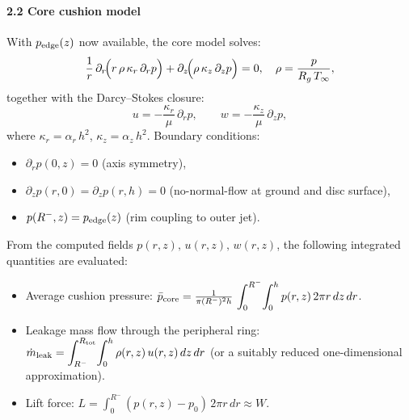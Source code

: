 \documentclass[11pt,a4paper]{article}
\begin{document}
\paragraph{2.2 Core cushion model}  
With \(p_{\rm edge}(z)\) now available, the core model solves:
\[
  \frac{1}{r}\,\partial_r\!\Bigl(r\,\rho\,\kappa_r\,\partial_r p\Bigr)
  + \partial_z\!\Bigl(\rho\,\kappa_z\,\partial_z p\Bigr) = 0,
  \quad
  \rho = \frac{p}{R_g\,T_\infty}, 
\]
together with the Darcy–Stokes closure:
\[
  u = -\frac{\kappa_r}{\mu}\,\partial_r p,
  \qquad
  w = -\frac{\kappa_z}{\mu}\,\partial_z p,
\]
where \(\kappa_r=\alpha_r\,h^2\), \(\kappa_z=\alpha_z\,h^2\).  
Boundary conditions:
\begin{itemize}
  \item \(\partial_r p(0,z)=0\) (axis symmetry),
  \item \(\partial_z p(r,0)=\partial_z p(r,h)=0\) (no-normal-flow at ground and disc surface),
  \item \(p(R^{-},z)=p_{\rm edge}(z)\) (rim coupling to outer jet).
\end{itemize}
From the computed fields \(p(r,z),\,u(r,z),\,w(r,z)\), the following integrated quantities are evaluated:
\begin{itemize}
  \item Average cushion pressure: \(\bar p_{\rm core} = \frac{1}{\pi (R^{-})^2 h}\,\displaystyle\int_0^{R^{-}}\!\int_0^h p(r,z)\,2\pi r\,dz\,dr\).
  \item Leakage mass flow through the peripheral ring: \(\dot m_{\rm leak} = \displaystyle\int_{R^{-}}^{R_{\rm tot}}\!\int_0^{h}\rho(r,z)\,u(r,z)\,dz\,dr\) (or a suitably reduced one-dimensional approximation).
  \item Lift force: \( L = \displaystyle\int_{0}^{R^{-}}\!\! (p(r,z)-p_0)\,2\pi r\,dr \approx W \).
\end{itemize}
\end{document}
